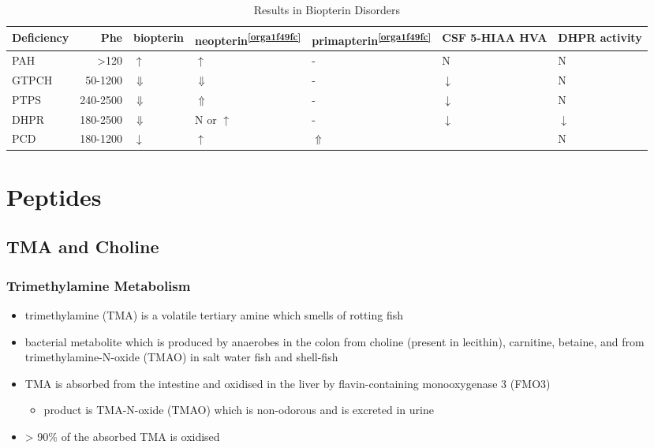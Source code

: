 \documentclass[12pt]{scrartcl}
\begin{document}
\begin{table}[htbp]
\caption{\label{tab:orgbb72b57}Results in Biopterin Disorders}
\centering
\begin{tabular}{lrlllll}
Deficiency & Phe & biopterin\footnotemark & neopterin\textsuperscript{\ref{orga1f49fc}} & primapterin\textsuperscript{\ref{orga1f49fc}} & CSF 5-HIAA HVA & DHPR activity\\
\hline
PAH & \textgreater{}120 & \(\uparrow\) & \(\uparrow\) & - & N & N\\
GTPCH & 50-1200 & \(\Downarrow\) & \(\Downarrow\) & - & \(\downarrow\) & N\\
PTPS & 240-2500 & \(\Downarrow\) & \(\Uparrow\) & - & \(\downarrow\) & N\\
DHPR & 180-2500 & \(\Downarrow\) & N or \(\uparrow\) & - & \(\downarrow\) & \(\downarrow\)\\
PCD & 180-1200 & \(\downarrow\) & \(\uparrow\) & \(\Uparrow\) &  & N\\
\end{tabular}
\end{table}
\section{Peptides}
\label{sec:org61ab44f}
\subsection{TMA and Choline}
\label{sec:org22a7693}
\subsubsection{Trimethylamine Metabolism}
\label{sec:org8b8d3f0}
\begin{itemize}
\item trimethylamine (TMA) is a volatile tertiary amine which smells of rotting fish
\item bacterial metabolite which is produced by anaerobes in the colon
from choline (present in lecithin), carnitine, betaine, and from
trimethylamine-N-oxide (TMAO) in salt water fish and shell-fish
\item TMA is absorbed from the intestine and oxidised in the liver by
flavin-containing monooxygenase 3 (FMO3)
\begin{itemize}
\item product is TMA-N-oxide (TMAO) which is non-odorous and is
excreted in urine
\end{itemize}
\item \textgreater{} 90\% of the absorbed TMA is oxidised
\end{itemize}
\end{document}
